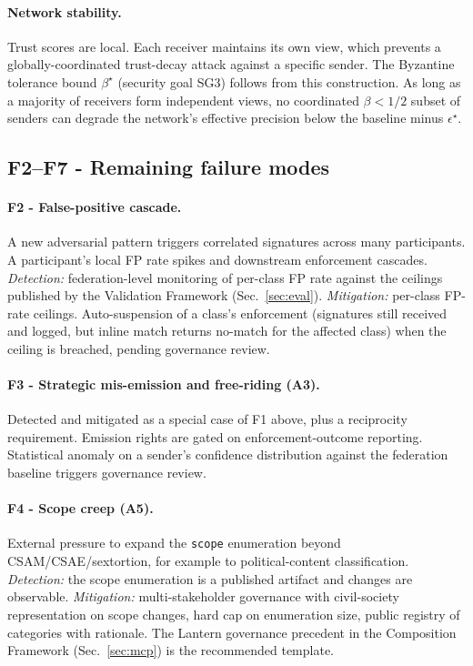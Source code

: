 \documentclass[11pt]{article}
\begin{document}
\paragraph{Network stability.} Trust scores are local. Each receiver maintains its own view, which prevents a globally-coordinated trust-decay attack against a specific sender. The Byzantine tolerance bound $\beta^\star$ (security goal SG3) follows from this construction. As long as a majority of receivers form independent views, no coordinated $\beta < 1/2$ subset of senders can degrade the network's effective precision below the baseline minus $\epsilon^\star$.

\subsection{F2--F7 - Remaining failure modes}

\paragraph{F2 - False-positive cascade.}
A new adversarial pattern triggers correlated signatures across many participants. A participant's local FP rate spikes and downstream enforcement cascades. \emph{Detection:} federation-level monitoring of per-class FP rate against the ceilings published by the Validation Framework (Sec.~\ref{sec:eval}). \emph{Mitigation:} per-class FP-rate ceilings. Auto-suspension of a class's enforcement (signatures still received and logged, but inline match returns no-match for the affected class) when the ceiling is breached, pending governance review.

\paragraph{F3 - Strategic mis-emission and free-riding (A3).}
Detected and mitigated as a special case of F1 above, plus a reciprocity requirement. Emission rights are gated on enforcement-outcome reporting. Statistical anomaly on a sender's confidence distribution against the federation baseline triggers governance review.

\paragraph{F4 - Scope creep (A5).}
External pressure to expand the \texttt{scope} enumeration beyond CSAM/CSAE/sextortion, for example to political-content classification. \emph{Detection:} the scope enumeration is a published artifact and changes are observable. \emph{Mitigation:} multi-stakeholder governance with civil-society representation on scope changes, hard cap on enumeration size, public registry of categories with rationale. The Lantern governance precedent in the Composition Framework (Sec.~\ref{sec:mcp}) is the recommended template.
\end{document}
